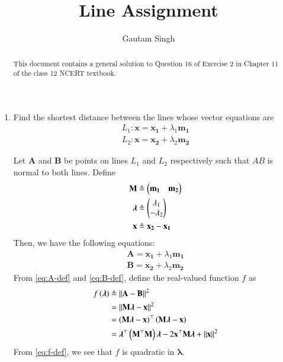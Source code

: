 \documentclass[journal,12pt,twocolumn]{IEEEtran}
\renewcommand{\vec}[1]{\boldsymbol{\mathbf{#1}}}
\begin{document}
\vspace{3cm}
\title{Line Assignment}
\author{Gautam Singh}
\maketitle
\bigskip

\begin{abstract}
    This document contains a general solution to Question 16 of 
    Exercise 2 in Chapter 11 of the class 12 NCERT textbook.
\end{abstract}

\begin{enumerate}
    \item Find the shortest distance between the lines whose vector equations are
    \begin{align}
        L_1: \vec{x} = \vec{x_1} + \lambda_1\vec{m_1} \label{eq:L1} \\
        L_2: \vec{x} = \vec{x_2} + \lambda_2\vec{m_2} \label{eq:L2}
    \end{align}

    \solution Let $\vec{A}$ and $\vec{B}$ be points on lines $L_1$ and $L_2$
    respectively such that $AB$ is normal to both lines. Define
    \begin{align}
        \vec{M} &\triangleq \myvec{\vec{m_1} & \vec{m_2}} \label{eq:M-def} \\
        \vec{\lambda} &\triangleq \myvec{\lambda_1\\-\lambda_2} \label{eq:lambda-def} \\
        \vec{x} &\triangleq \vec{x_2} - \vec{x_1} \label{eq:x-def}
    \end{align}
    Then, we have the following equations:
    \begin{align}
        \vec{A} = \vec{x_1} + \lambda_1\vec{m_1} \label{eq:A-def} \\
        \vec{B} = \vec{x_2} + \lambda_2\vec{m_2} \label{eq:B-def}
    \end{align}
    From \eqref{eq:A-def} and \eqref{eq:B-def}, define the real-valued function
    $f$ as
    \begin{align}
        f\brak{\vec{\lambda}} &\triangleq \norm{\vec{A}-\vec{B}}^2 \\
                              &= \norm{\vec{M}\vec{\lambda}-\vec{x}}^2 \\
                              &= \brak{\vec{M\lambda}-\vec{x}}^\top\brak{\vec{M\lambda}-\vec{x}} \\
                              &= \vec{\lambda}^\top\brak{\vec{M}^\top\vec{M}}\vec{\lambda} - 2\vec{x}^\top\vec{M\lambda} + \norm{\vec{x}}^2
        \label{eq:f-def}
    \end{align}
    From \eqref{eq:f-def}, we see that $f$ is quadratic in $\vec{\lambda}$.


\end{enumerate}
\end{document}
